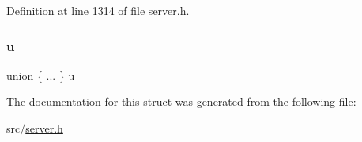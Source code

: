 Definition at line 1314 of file server.\+h.

\mbox{\label{struct__redis_sort_object_a27255f4355dc7226770c0682f29744b0}} 
\subsubsection{\texorpdfstring{u}{u}}
{\footnotesize\ttfamily union \{ ... \}   u}



The documentation for this struct was generated from the following file\+:\begin{DoxyCompactItemize}
\item 
src/\hyperlink{server_8h}{server.\+h}\end{DoxyCompactItemize}
